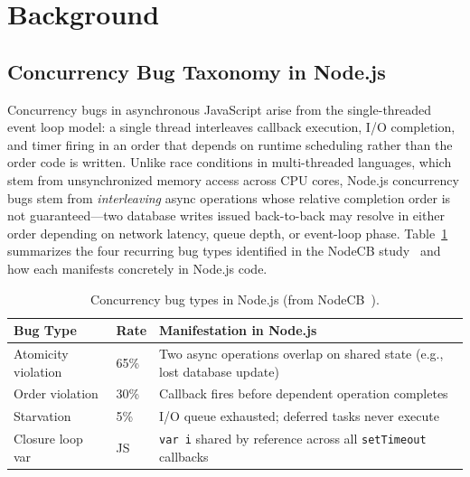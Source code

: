 \documentclass[runningheads]{llncs}
\begin{document}
\section{Background}
\label{sec:background}

\subsection{Concurrency Bug Taxonomy in Node.js}
\label{sec:bg:taxonomy}

Concurrency bugs in asynchronous JavaScript arise from the single-threaded
event loop model: a single thread interleaves callback execution, I/O
completion, and timer firing in an order that depends on runtime
scheduling rather than the order code is written.
Unlike race conditions in multi-threaded languages, which stem from
unsynchronized memory access across CPU cores, Node.js concurrency bugs
stem from \emph{interleaving} async operations whose relative completion
order is not guaranteed---two database writes issued back-to-back may
resolve in either order depending on network latency, queue depth, or
event-loop phase.
Table~\ref{tab:taxonomy} summarizes the four recurring bug types
identified in the NodeCB study~\cite{nodecb2017} and how each manifests
concretely in Node.js code.

\begin{table}[H]
  \centering
  \caption{Concurrency bug types in Node.js (from NodeCB~\cite{nodecb2017}).}
  \label{tab:taxonomy}
  \begin{tabular}{@{}llp{5.5cm}@{}}
    \toprule
    \textbf{Bug Type} & \textbf{Rate} & \textbf{Manifestation in Node.js} \\
    \midrule
    Atomicity violation & 65\% & Two async operations overlap on shared state (e.g., lost database update) \\
    Order violation     & 30\% & Callback fires before dependent operation completes \\
    Starvation          & 5\%  & I/O queue exhausted; deferred tasks never execute \\
    Closure loop var    & JS   & \texttt{var i} shared by reference across all \texttt{setTimeout} callbacks \\
    \bottomrule
  \end{tabular}
\end{table}
\end{document}
